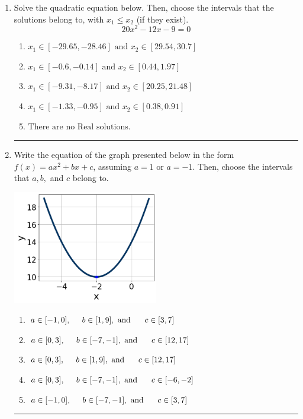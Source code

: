 \documentclass[14pt]{extbook}
\newcommand{\litem}[1]{\item#1\hspace*{-1cm}\rule{\textwidth}{0.4pt}}
\begin{document}
\begin{enumerate}
{\begin{enumerate}[label=\Alph*.]
\end{enumerate} }
\litem{
Solve the quadratic equation below. Then, choose the intervals that the solutions belong to, with $x_1 \leq x_2$ (if they exist).\[ 20x^{2} -12 x -9 = 0 \]\begin{enumerate}[label=\Alph*.]
\item \( x_1 \in [-29.65, -28.46] \text{ and } x_2 \in [29.54, 30.7] \)
\item \( x_1 \in [-0.6, -0.14] \text{ and } x_2 \in [0.44, 1.97] \)
\item \( x_1 \in [-9.31, -8.17] \text{ and } x_2 \in [20.25, 21.48] \)
\item \( x_1 \in [-1.33, -0.95] \text{ and } x_2 \in [0.38, 0.91] \)
\item \( \text{There are no Real solutions.} \)

\end{enumerate} }
\litem{
Write the equation of the graph presented below in the form $f(x)=ax^2+bx+c$, assuming  $a=1$ or $a=-1$. Then, choose the intervals that $a, b,$ and $c$ belong to.
\begin{center}
    \includegraphics[width=0.5\textwidth]{../Figures/quadraticGraphToEquationCopyC.png}
\end{center}
\begin{enumerate}[label=\Alph*.]
\item \( a \in [-1, 0], \hspace*{5mm} b \in [1, 9], \text{ and } \hspace*{5mm} c \in [3, 7] \)
\item \( a \in [0, 3], \hspace*{5mm} b \in [-7, -1], \text{ and } \hspace*{5mm} c \in [12, 17] \)
\item \( a \in [0, 3], \hspace*{5mm} b \in [1, 9], \text{ and } \hspace*{5mm} c \in [12, 17] \)
\item \( a \in [0, 3], \hspace*{5mm} b \in [-7, -1], \text{ and } \hspace*{5mm} c \in [-6, -2] \)
\item \( a \in [-1, 0], \hspace*{5mm} b \in [-7, -1], \text{ and } \hspace*{5mm} c \in [3, 7] \)


\end{enumerate}}
\end{enumerate}
\end{document}

